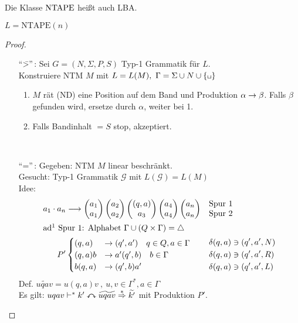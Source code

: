 \begin{Bemerkung}
	Die Klasse $\operatorname{NTAPE}$ heißt auch \ac{LBA}.
\end{Bemerkung}
%
\begin{Satz}\label{satz:6.3}
	$L=\mathrm{NTAPE}(n)$
\end{Satz}
\begin{proof}\
\begin{itemize}
	\item["`\=>"'\,:] Sei $G=(N,\Sigma,P,S)$ Typ-1 Grammatik für $L$.\\
		Konstruiere \ac{NTM} $M$ mit $L=L(M),\ \Gamma = \Sigma\cup N\cup\{\blank\}$
		\begin{enumerate}
		\item $M$ rät (\ac{ND}) eine Position auf dem Band und Produktion $\alpha\-> \beta$. Falls $\beta$ gefunden wird, ersetze durch $\alpha$, weiter bei 1.
		\item Falls Bandinhalt $=S$ \quad stop, akzeptiert.
		\end{enumerate}
		\
	\item["`\<="'\,:] %
	Gegeben: \ac{NTM} $M$ linear beschränkt.\\
	Gesucht: Typ-1 Grammatik $\mathcal{G}$ mit $L(\mathcal{G})=L(M)$\\
	Idee: 
	\begin{align*}
		a_1\cdot a_n &\-->
			\pmqty{a_1\\a_1} \pmqty{a_2\\a_2} \pmqty{(q,a)\\a_3} \pmqty{a_4\\a_4} \pmqty{a_n\\a_n}
			&&\begin{matrix}\text{Spur 1}\\\text{Spur 2}\end{matrix}\\
	\shortintertext{ad\footnotemark\ Spur 1: Alphabet $\Gamma\cup(Q\x\Gamma) = \triangle$}
		P' &\begin{cases}
			(q,a) &\-> (q',a')   \quad q\in Q,a\in\Gamma\\
			(q,a)b &\-> a'(q',b) \quad b\in\Gamma\\
			b(q,a) &\-> (q',b)a'
		\end{cases}
		& &\begin{aligned}
			\delta(q,a) &\ni (q',a',N)\\
			\delta(q,a) &\ni (q',a',R)\\
			\delta(q,a) &\ni (q',a',L)
		\end{aligned}
	\end{align*}%
	Def. $\widetilde{uqav} = u(q,a)v\ ,\ u,v\in\Gamma^*,a\in\Gamma$\\
	Es gilt: $uqav\vdash^* k' \curvearrowleftright \widetilde{uqav} \overset{*}{\=>} \widetilde{k'}$ mit Produktion $P'$.
	

\end{itemize}
\end{proof}
